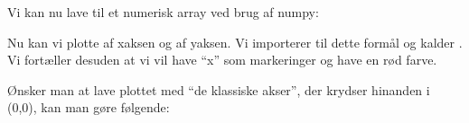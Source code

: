 \documentclass[letterpaper,10pt,english]{jupyterBook}
\begin{document}
Vi kan nu lave  til et numerisk array ved brug af numpy:

\begin{sphinxVerbatim}[commandchars=\\\{\}]
   
     
\end{sphinxVerbatim}

Nu kan vi plotte  af x\sphinxhyphen{}aksen og  af y\sphinxhyphen{}aksen. Vi importerer  til dette formål og kalder . Vi fortæller desuden at vi vil have “x” som markeringer og have en rød farve.

\begin{sphinxVerbatim}[commandchars=\\\{\}]
   

     
\end{sphinxVerbatim}

\begin{sphinxVerbatim}
\end{sphinxVerbatim}

\noindent{}

Ønsker man at lave plottet med “de klassiske akser”, der krydser hinanden i (0,0), kan man gøre følgende:
\end{document}
